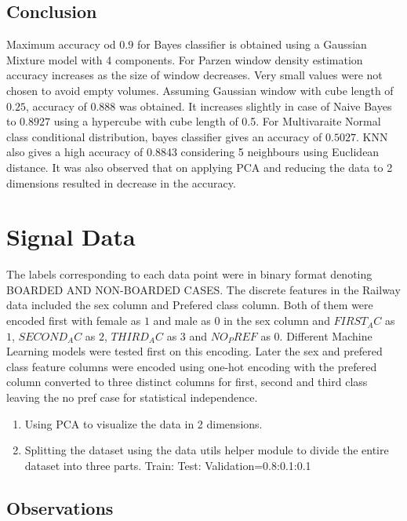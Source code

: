 \documentclass[12pt,journal,compsoc]{IEEEtran}
\begin{document}
\subsection{Conclusion}
\noindent Maximum accuracy od $0.9$ for Bayes classifier is obtained using a Gaussian Mixture model with 4 components. For Parzen window density estimation accuracy increases as the size of window decreases. Very small values were not chosen to avoid empty volumes. Assuming Gaussian window with cube length of $0.25$, accuracy of 0.888 was obtained. It increases slightly in case of Naive Bayes to $0.8927$ using a hypercube with cube length of 0.5. For Multivaraite Normal class conditional distribution, bayes classifier gives an accuracy of $0.5027$. KNN also gives a high accuracy of 0.8843 considering 5 neighbours using Euclidean distance. It was also observed that on applying PCA and reducing the data to 2 dimensions resulted in decrease in the accuracy. 
\section{Signal Data}
\noindent The labels corresponding to each data point were in binary format denoting BOARDED AND NON-BOARDED CASES. The discrete features in the Railway data included the sex column and Prefered class column. Both of them were encoded first with female as $1$ and male as $0$ in the sex column and $FIRST_AC$ as $1$, $SECOND_AC$ as $2$, $THIRD_AC$ as $3$ and $NO_PREF$ as $0$. Different Machine Learning models were tested first on this encoding. Later the sex and prefered class feature columns were encoded using one-hot encoding with the prefered column converted to three distinct columns for first, second and third class leaving the no pref case for statistical independence. 

\begin{enumerate}
\item Using PCA to visualize the data in 2 dimensions.

\item Splitting the dataset using the data utils helper module to divide the entire dataset into three parts. Train: Test: Validation=0.8:0.1:0.1

\end{enumerate}
\pagebreak
\subsection{Observations}
\end{document}
